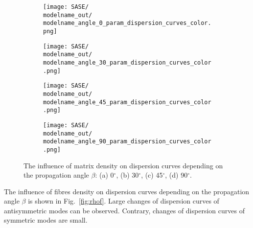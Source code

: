 \documentclass[preprint,12pt]{elsarticle}
\begin{document}
 \begin{figure} [h!]
 	\newcommand{\modelname}{SASE2}
 	\centering
 	\begin{subfigure}[b]{0.49\textwidth}
 		\centering
 		\texttt{[image: SASE/\\modelname\_out/\\modelname\_angle\_0\_param\_dispersion\_curves\_color.png]}
 		\caption{}
 		\label{fig:rhom0}
 	\end{subfigure}
 	\hfill
 	\begin{subfigure}[b]{0.49\textwidth}
 		\centering
 		\texttt{[image: SASE/\\modelname\_out/\\modelname\_angle\_30\_param\_dispersion\_curves\_color.png]}
 		\caption{}
 		\label{fig:rhom30}
 	\end{subfigure}
 	\begin{subfigure}[b]{0.49\textwidth}
 		\centering
 		\texttt{[image: SASE/\\modelname\_out/\\modelname\_angle\_45\_param\_dispersion\_curves\_color.png]}
 		\caption{}
 		\label{fig:rhom45}
 	\end{subfigure}
 	\hfill
 	\begin{subfigure}[b]{0.49\textwidth}
 		\centering
 		\texttt{[image: SASE/\\modelname\_out/\\modelname\_angle\_90\_param\_dispersion\_curves\_color.png]}
 		\caption{}
 		\label{fig:rhom90}
 	\end{subfigure}
 	\caption{The influence of matrix density on dispersion curves depending on the propagation angle $\beta$: (a) 0$^{\circ}$, (b) 30$^{\circ}$, (c) 45$^{\circ}$, (d) 90$^{\circ}$.} 
 	\label{fig:rhom}
 \end{figure}
\clearpage

The influence of fibres density on dispersion curves depending on the propagation angle $\beta$ is shown in Fig.~\ref{fig:rhof}. Large changes of dispersion curves of antisymmetric modes can be observed. Contrary, changes of dispersion curves of symmetric modes are small.
\end{document}
